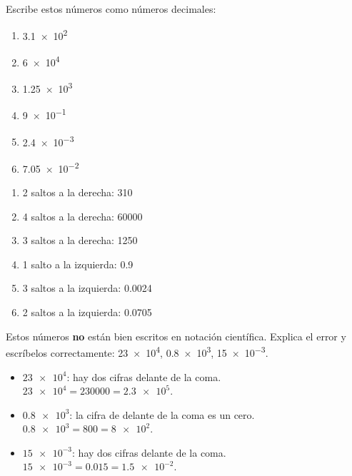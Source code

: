 \begin{exercise}
    Escribe estos números como números decimales:
    \begin{enumerate}[label=\letraminuscula]
        \item \num{3.1e2}
        \item \num{6e4}
        \item \num{1.25e3}
        \item \num{9e-1}
        \item \num{2.4e-3}
        \item \num{7.05e-2}
    \end{enumerate}
    \begin{solu}
        \begin{enumerate}[label=\alph*)]
            \item 2 saltos a la derecha: \num{310}
            \item 4 saltos a la derecha: \num{60000}
            \item 3 saltos a la derecha: \num{1250}
            \item 1 salto a la izquierda: \num{0.9}
            \item 3 saltos a la izquierda: \num{0.0024}
            \item 2 saltos a la izquierda: \num{0.0705}
        \end{enumerate}
    \end{solu}
\end{exercise}

\begin{exercise}
    Estos números \textbf{no} están bien escritos en notación científica. Explica el error y escríbelos correctamente: \num{23e4}, \num{0.8e3}, \num{15e-3}.
    \begin{solu}
        \begin{itemize}
            \item \(\num{23e4}\): hay dos cifras delante de la coma. \(\num{23e4} = \num{230000} = \num{2.3e5}\).
            \item \(\num{0.8e3}\): la cifra de delante de la coma es un cero. \(\num{0.8e3} = \num{800} = \num{8e2}\).
            \item \(\num{15e-3}\): hay dos cifras delante de la coma. \(\num{15e-3} = \num{0.015} = \num{1.5e-2}\).
        \end{itemize}
    \end{solu}
\end{exercise}

